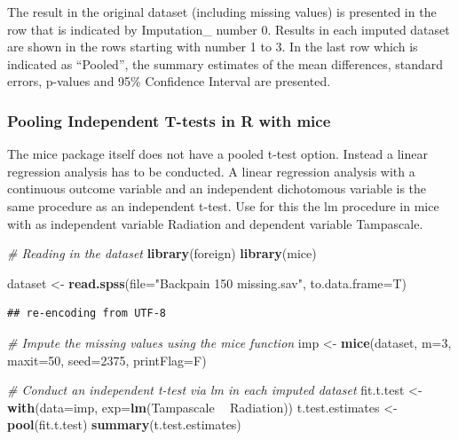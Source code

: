 \documentclass[]{book}
\newenvironment{Shaded}{\begin{snugshade}}{\end{snugshade}}
\newcommand{\KeywordTok}[1]{\textcolor[rgb]{0.13,0.29,0.53}{\textbf{#1}}}
\newcommand{\DataTypeTok}[1]{\textcolor[rgb]{0.13,0.29,0.53}{#1}}
\newcommand{\DecValTok}[1]{\textcolor[rgb]{0.00,0.00,0.81}{#1}}
\newcommand{\StringTok}[1]{\textcolor[rgb]{0.31,0.60,0.02}{#1}}
\newcommand{\CommentTok}[1]{\textcolor[rgb]{0.56,0.35,0.01}{\textit{#1}}}
\newcommand{\OperatorTok}[1]{\textcolor[rgb]{0.81,0.36,0.00}{\textbf{#1}}}
\newcommand{\NormalTok}[1]{#1}
\theoremstyle{definition}
\theoremstyle{definition}
\theoremstyle{definition}
\theoremstyle{remark}
\begin{document}
The result in the original dataset (including missing values) is
presented in the row that is indicated by Imputation\_ number 0. Results
in each imputed dataset are shown in the rows starting with number 1 to
3. In the last row which is indicated as ``Pooled'', the summary
estimates of the mean differences, standard errors, p-values and 95\%
Confidence Interval are presented.

\subsubsection{Pooling Independent T-tests in R with
mice}\label{pooling-independent-t-tests-in-r-with-mice}

The mice package itself does not have a pooled t-test option. Instead a
linear regression analysis has to be conducted. A linear regression
analysis with a continuous outcome variable and an independent
dichotomous variable is the same procedure as an independent t-test. Use
for this the lm procedure in mice with as independent variable Radiation
and dependent variable Tampascale.

\begin{Shaded}
\begin{Highlighting}[]
\CommentTok{# Reading in the dataset}
\KeywordTok{library}\NormalTok{(foreign)}
\KeywordTok{library}\NormalTok{(mice)}

\NormalTok{dataset <-}\StringTok{ }\KeywordTok{read.spss}\NormalTok{(}\DataTypeTok{file=}\StringTok{"Backpain 150 missing.sav"}\NormalTok{, }\DataTypeTok{to.data.frame=}\NormalTok{T)}
\end{Highlighting}
\end{Shaded}

\begin{verbatim}
## re-encoding from UTF-8
\end{verbatim}

\begin{Shaded}
\begin{Highlighting}[]
\CommentTok{# Impute the missing values using the mice function }
\NormalTok{imp <-}\StringTok{ }\KeywordTok{mice}\NormalTok{(dataset, }\DataTypeTok{m=}\DecValTok{3}\NormalTok{, }\DataTypeTok{maxit=}\DecValTok{50}\NormalTok{, }\DataTypeTok{seed=}\DecValTok{2375}\NormalTok{, }\DataTypeTok{printFlag=}\NormalTok{F)}
 
\CommentTok{# Conduct an independent t-test via lm in each imputed dataset}
\NormalTok{fit.t.test <-}\StringTok{ }\KeywordTok{with}\NormalTok{(}\DataTypeTok{data=}\NormalTok{imp, }\DataTypeTok{exp=}\KeywordTok{lm}\NormalTok{(Tampascale }\OperatorTok{~}\StringTok{ }\NormalTok{Radiation))}
\NormalTok{t.test.estimates <-}\StringTok{ }\KeywordTok{pool}\NormalTok{(fit.t.test)}
\KeywordTok{summary}\NormalTok{(t.test.estimates)}
\end{Highlighting}
\end{Shaded}
\end{document}
